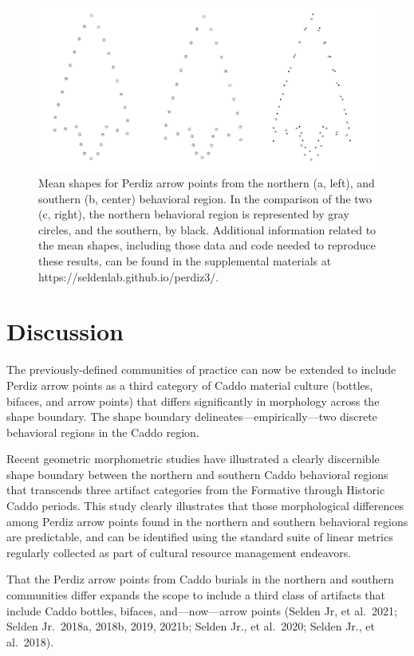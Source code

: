 \documentclass[smallextended]{svjour3}       %
\begin{document}
\begin{figure}
\includegraphics[width=1\linewidth]{ms-figs/figure5} \caption{Mean shapes for Perdiz arrow points from the northern (a, left), and southern (b, center) behavioral region. In the comparison of the two (c, right), the northern behavioral region is represented by gray circles, and the southern, by black. Additional information related to the mean shapes, including those data and code needed to reproduce these results, can be found in the supplemental materials at https://seldenlab.github.io/perdiz3/.}\label{fig:fig5}
\end{figure}

\hypertarget{discussion}{%
\section{Discussion}\label{discussion}}

The previously-defined communities of practice can now be extended to
include Perdiz arrow points as a third category of Caddo material
culture (bottles, bifaces, and arrow points) that differs significantly
in morphology across the shape boundary. The shape boundary
delineates---empirically---two discrete behavioral regions in the Caddo
region.

Recent geometric morphometric studies have illustrated a clearly
discernible shape boundary between the northern and southern Caddo
behavioral regions that transcends three artifact categories from the
Formative through Historic Caddo periods. This study clearly illustrates
that those morphological differences among Perdiz arrow points found in
the northern and southern behavioral regions are predictable, and can be
identified using the standard suite of linear metrics regularly
collected as part of cultural resource management endeavors.

That the Perdiz arrow points from Caddo burials in the northern and
southern communities differ expands the scope to include a third class
of artifacts that include Caddo bottles, bifaces, and---now---arrow
points (Selden Jr, et al.~2021; Selden Jr.~2018a, 2018b, 2019, 2021b;
Selden Jr., et al.~2020; Selden Jr., et al.~2018).
\end{document}
